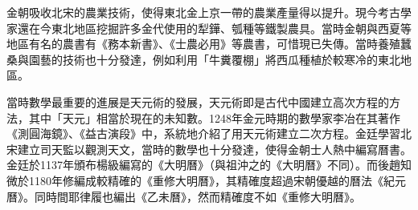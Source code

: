 金朝吸收北宋的農業技術，使得東北金上京一帶的農業產量得以提升。現今考古學家還在今東北地區挖掘許多金代使用的犁鏵、瓠種等鐵製農具。當時金朝與西夏等地區有名的農書有《務本新書》、《士農必用》等農書，可惜現已失傳。當時養殖蠶桑與園藝的技術也十分發達，例如利用「牛糞覆棚」將西瓜種植於較寒冷的東北地區。

當時數學最重要的進展是天元術的發展，天元術即是古代中國建立高次方程的方法，其中「天元」相當於現在的未知數。1248年金元時期的數學家李冶在其著作《測圓海鏡》、《益古演段》中，系統地介紹了用天元術建立二次方程。金廷學習北宋建立司天監以觀測天文，當時的數學也十分發達，使得金朝士人熱中編寫曆書。金廷於1137年頒布楊級編寫的《大明曆》（與祖沖之的《大明曆》不同）。而後趙知微於1180年修編成較精確的《重修大明曆》，其精確度超過宋朝優越的曆法《紀元曆》。同時間耶律履也編出《乙未曆》，然而精確度不如《重修大明曆》。













